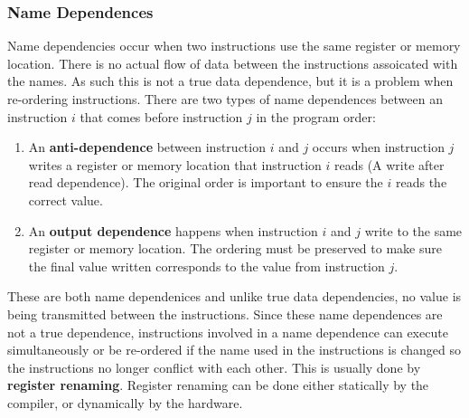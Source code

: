 \documentclass[11pt]{article}
\begin{document}
\subsubsection{Name Dependences}
Name dependencies occur when two instructions use the same register or memory location. There is no actual flow of data between the instructions assoicated with the names. As such this is not a true data dependence, but it is a problem when re-ordering instructions. There are two types of name dependences between an instruction $i$ that comes before instruction $j$ in the program order:
\begin{enumerate}
\item An \textbf{anti-dependence} between instruction $i$ and $j$ occurs when instruction $j$ writes a register or memory location that instruction $i$ reads (A write after read dependence). The original order is important to ensure the $i$ reads the correct value.
\item An \textbf{output dependence} happens when instruction $i$ and $j$ write to the same register or memory location. The ordering must be preserved to make sure the final value written corresponds to the value from instruction $j$.
\end{enumerate}
\noindent
These are both name dependenices and unlike true data dependencies, no value is being transmitted between the instructions. Since these name dependences are not a true dependence, instructions involved in a name dependence can execute simultaneously or be re-ordered if the name used in the instructions is changed so the instructions no longer conflict with each other. This is usually done by \textbf{register renaming}. Register renaming can be done either statically by the compiler, or dynamically by the hardware.
\end{document}
